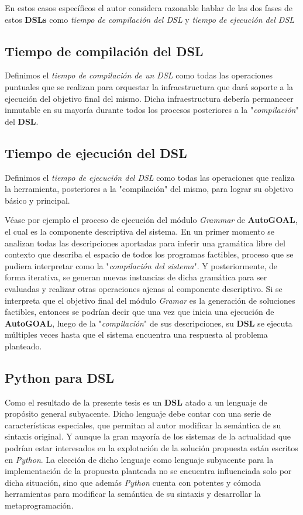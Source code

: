 En estos casos específicos el autor considera razonable hablar de las dos fases de
estos {\bf DSLs} como {\it tiempo de compilación del DSL} y
      {\it tiempo de ejecución del DSL}

\subsection{Tiempo de compilación del DSL}


Definimos el {\it tiempo de compilación de un DSL} como todas las operaciones puntuales que se
realizan para orquestar la infraestructura que dará soporte a la ejecución del objetivo
final del mismo. Dicha infraestructura debería permanecer inmutable en su mayoría
durante todos los procesos posteriores a la "{\it compilación}" del {\bf DSL}.

\subsection{Tiempo de ejecución del DSL}


Definimos el {\it tiempo de ejecución del DSL} como todas las operaciones que realiza
la herramienta, posteriores a la "compilación" del mismo, para lograr su objetivo básico y
principal.

Véase por ejemplo el proceso de ejecución del módulo {\it Grammar} de {\bf AutoGOAL}, el cual es
la componente descriptiva del sistema. En un primer momento se analizan todas las descripciones
aportadas para inferir una gramática libre del contexto que describa el espacio de todos los
programas factibles, proceso que se pudiera interpretar como la "{\it compilación del sistema}". Y
posteriormente, de forma iterativa, se generan nuevas instancias de dicha gramática para ser
evaluadas y realizar otras operaciones ajenas al componente descriptivo. Si se interpreta que
el objetivo final del módulo {\it Gramar} es la generación de soluciones factibles, entonces se
podrían decir que una vez que inicia una ejecución de {\bf AutoGOAL}, luego de la "{\it compilación}"
de sus descripciones, su {\bf DSL} se ejecuta múltiples veces hasta que el sistema encuentra una
respuesta al problema planteado.

\subsection{Python para DSL}

Como el resultado de la presente tesis es un {\bf DSL} atado a un lenguaje de propósito general
subyacente. Dicho lenguaje debe contar con una serie de características especiales,
que permitan al autor modificar la semántica de su sintaxis original. Y aunque la gran mayoría
de los sistemas de la actualidad que podrían estar interesados en la explotación de la solución
propuesta están escritos en {\it Python}. La elección de dicho lenguaje como lenguaje subyacente
para la implementación de la propuesta planteada no se encuentra influenciada solo por dicha
situación, sino que además {\it Python} cuenta con potentes y cómoda herramientas para modificar
la semántica de su sintaxis y desarrollar la metaprogramación.

